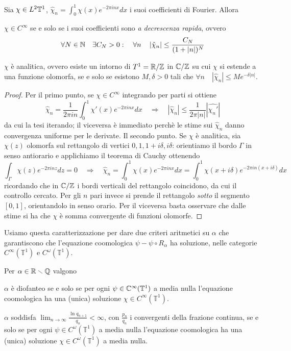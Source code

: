 \begin{teo}Sia $\chi\in L^2\mathbb{T}^1$, $\hat\chi_n=\int_0^1\chi(x)e^{-2\pi inx}dx$ i suoi coefficienti di Fourier. Allora
\begin{lista}
 \item $\chi\in C^\infty$ se e solo se i suoi coefficienti sono \emph{a decrescenza rapida}, ovvero
      \[\forall N\in \mathbb{N}\quad \exists C_N>0: \quad \forall n \quad \left|\hat\chi_n\right|\leq\frac{C_N}{(1+|n|)^N}\]
 \item $\chi$ è analitica, ovvero esiste un intorno di $T^1=\mathbb{R}/\mathbb{Z}$ in $\mathbb{C}/\mathbb{Z}$ su cui $\chi$ si estende a una funzione olomorfa, se e solo se esistono $M,\delta>0$ tali che $\forall n \quad \left|\hat\chi_n\right|\leq Me^{-\delta |n|}$.
\end{lista}
\end{teo}
\begin{proof}
 Per il primo punto, se $\chi\in C^\infty$ integrando per parti si ottiene
 \[\hat\chi_n=\frac{1}{2\pi in}\int_0^1\chi'(x)e^{-2\pi inx}dx \quad \Rightarrow \quad \left|\hat\chi_n\right|\leq \frac{1}{2\pi |n|}\left|\widehat{\chi_n'}\right|\]
 da cui la tesi iterando; il viceversa è immediato perchè le stime sui $\hat\chi_n$ danno convergenza uniforme per le derivate.
 Il secondo punto. Se $\chi$ è analitica, sia $\chi(z)$ olomorfa sul rettangolo di vertici $0, 1,1+i\delta,i\delta$: orientiamo il bordo $\Gamma$ in senso antiorario e applichiamo il teorema di Cauchy ottenendo
 \[\int_\Gamma \chi(z)e^{-2\pi inz}dz=0 \quad \Rightarrow \quad \hat\chi_n=\int_0^1\chi(x)e^{-2\pi inx}dx=\int_0^1\chi(x+i\delta)e^{-2\pi in(x+i\delta)}dx\]
 ricordando che in $\mathbb{C}/\mathbb{Z}$ i bordi verticali del rettangolo coincidono, da cui il controllo cercato. Per gli $n$ pari invece si prende il rettangolo \emph{sotto} il segmento $[0,1]$, orientandolo in senso orario. Per il viceversa basta osservare che dalle stime si ha che $\chi$ è somma convergente di funzioni olomorfe. 
\end{proof}

Usiamo questa caratterizzazione per dare due criteri aritmetici su $\alpha$ che garantiscono
che l'equazione coomologica $\psi-\psi\circ R_\alpha$ ha soluzione,
nelle categorie $C^\infty(\mathbb{T}^1)$ e $C^\omega(\mathbb{T}^1)$.

\begin{teo}Per $\alpha\in\mathbb{R}\smallsetminus\mathbb{Q}$ valgono
\begin{lista}
\item $\alpha$ è diofanteo se e solo se per ogni $\psi\in\mathbb{C}^\infty(\mathbb{T}^1)$ a media nulla
l'equazione coomologica ha una (unica) soluzione $\chi\in C^\infty(\mathbb{T}^1)$.
\item $\alpha$ soddisfa $\lim_{n\to\infty}\frac{\ln q_{n+1}}{q_n}<\infty$, con $\frac{p_n}{q_n}$ i convergenti della frazione continua,
se e solo se per ogni $\psi\in C^\omega(\mathbb{T}^1)$ a media nulla
l'equazione coomologica ha una (unica) soluzione $\chi\in C^\omega(\mathbb{T}^1)$ a media nulla.
\end{lista}
\end{teo}

